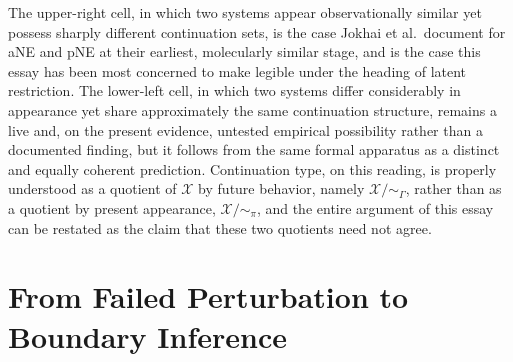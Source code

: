 \documentclass[11pt]{article}
\begin{document}
The upper-right cell, in which two systems appear observationally similar yet possess sharply different continuation sets, is the case Jokhai et al.\ document for aNE and pNE at their earliest, molecularly similar stage, and is the case this essay has been most concerned to make legible under the heading of latent restriction. The lower-left cell, in which two systems differ considerably in appearance yet share approximately the same continuation structure, remains a live and, on the present evidence, untested empirical possibility rather than a documented finding, but it follows from the same formal apparatus as a distinct and equally coherent prediction. Continuation type, on this reading, is properly understood as a quotient of $\mathcal{X}$ by future behavior, namely $\mathcal{X}/{\sim_\Gamma}$, rather than as a quotient by present appearance, $\mathcal{X}/{\sim_\pi}$, and the entire argument of this essay can be restated as the claim that these two quotients need not agree.

\section{From Failed Perturbation to Boundary Inference}
\end{document}
